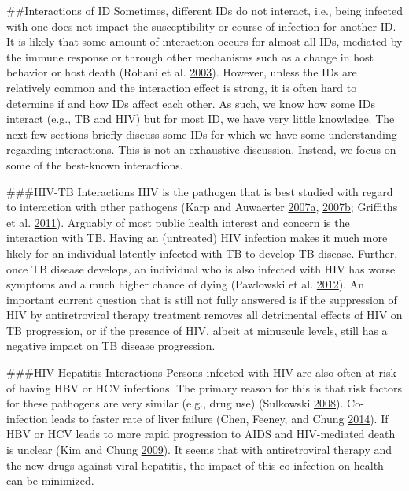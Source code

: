 \documentclass[]{book}
\theoremstyle{definition}
\theoremstyle{definition}
\theoremstyle{definition}
\theoremstyle{remark}
\begin{document}
\#\#Interactions of ID Sometimes, different IDs do not interact, i.e.,
being infected with one does not impact the susceptibility or course of
infection for another ID. It is likely that some amount of interaction
occurs for almost all IDs, mediated by the immune response or through
other mechanisms such as a change in host behavior or host death (Rohani
et al. \protect\hyperlink{ref-rohani03}{2003}). However, unless the IDs
are relatively common and the interaction effect is strong, it is often
hard to determine if and how IDs affect each other. As such, we know how
some IDs interact (e.g., TB and HIV) but for most ID, we have very
little knowledge. The next few sections briefly discuss some IDs for
which we have some understanding regarding interactions. This is not an
exhaustive discussion. Instead, we focus on some of the best-known
interactions.

\#\#\#HIV-TB Interactions HIV is the pathogen that is best studied with
regard to interaction with other pathogens (Karp and Auwaerter
\protect\hyperlink{ref-karp07}{2007}\protect\hyperlink{ref-karp07}{a},
\protect\hyperlink{ref-karp07a}{2007}\protect\hyperlink{ref-karp07a}{b};
Griffiths et al. \protect\hyperlink{ref-griffiths11}{2011}). Arguably of
most public health interest and concern is the interaction with TB.
Having an (untreated) HIV infection makes it much more likely for an
individual latently infected with TB to develop TB disease. Further,
once TB disease develops, an individual who is also infected with HIV
has worse symptoms and a much higher chance of dying (Pawlowski et al.
\protect\hyperlink{ref-pawlowski12}{2012}). An important current
question that is still not fully answered is if the suppression of HIV
by antiretroviral therapy treatment removes all detrimental effects of
HIV on TB progression, or if the presence of HIV, albeit at minuscule
levels, still has a negative impact on TB disease progression.

\#\#\#HIV-Hepatitis Interactions Persons infected with HIV are also
often at risk of having HBV or HCV infections. The primary reason for
this is that risk factors for these pathogens are very similar (e.g.,
drug use) (Sulkowski \protect\hyperlink{ref-sulkowski08}{2008}).
Co-infection leads to faster rate of liver failure (Chen, Feeney, and
Chung \protect\hyperlink{ref-chen14}{2014}). If HBV or HCV leads to more
rapid progression to AIDS and HIV-mediated death is unclear (Kim and
Chung \protect\hyperlink{ref-kim09}{2009}). It seems that with
antiretroviral therapy and the new drugs against viral hepatitis, the
impact of this co-infection on health can be minimized.
\end{document}
